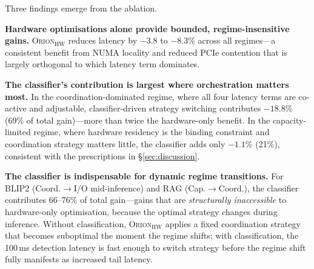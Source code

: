 Three findings emerge from the ablation.

\textbf{Hardware optimisations alone provide bounded, regime-insensitive gains.}
\textsc{Orion}$_{\mathrm{HW}}$ reduces latency by $-3.8$ to $-8.3\%$ across
all regimes---a consistent benefit from NUMA locality and reduced PCIe
contention that is largely orthogonal to which latency term dominates.

\textbf{The classifier's contribution is largest where orchestration matters most.}
In the coordination-dominated regime, where all four latency terms are
co-active and adjustable, classifier-driven strategy switching contributes
$-18.8\%$ (69\% of total gain)---more than twice the hardware-only benefit.
In the capacity-limited regime, where hardware residency is the binding
constraint and coordination strategy matters little, the classifier adds
only $-1.1\%$ (21\%), consistent with the prescriptions in \S\ref{sec:discussion}.

\textbf{The classifier is indispensable for dynamic regime transitions.}
For BLIP2 (Coord.$\to$I/O mid-inference) and RAG (Cap.$\to$Coord.),
the classifier contributes 66--76\% of total gain---gains that are
\emph{structurally inaccessible} to hardware-only optimisation, because
the optimal strategy changes during inference.
Without classification, \textsc{Orion}$_{\mathrm{HW}}$ applies a fixed
coordination strategy that becomes suboptimal the moment the regime shifts;
with classification, the 100\,ms detection latency is fast enough to switch
strategy before the regime shift fully manifests as increased tail latency.
